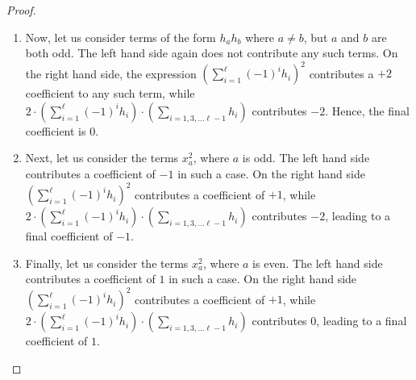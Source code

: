 \documentclass[11pt]{article}
\theoremstyle{definition}
\begin{document}
\begin{proof}
\begin{enumerate}
        \item Now, let us consider terms of the form  $h_ah_b$ where $a \neq b$, but $a$ and $b$ are both odd. The left hand side again does not contribute any such terms. On the right hand side, the expression $\left( \sum_{i = 1}^{\ell} (-1)^i h_i \right )^2$ contributes a $+2$ coefficient to any such term, while $2 \cdot \left ( \sum_{i = 1}^{\ell} (-1)^i h_i \right ) \cdot \left ( \sum_{i = 1, 3, \dots \ell-1} h_i \right )$ contributes $-2$. Hence, the final coefficient is $0$.
        \item Next, let us consider the terms $x_a^2$, where $a$ is odd. The left hand side contributes a coefficient of $-1$ in such a case. On the right hand side $\left( \sum_{i = 1}^{\ell} (-1)^i h_i \right )^2$ contributes a coefficient of $+1$, while $2 \cdot \left ( \sum_{i = 1}^{\ell} (-1)^i h_i \right ) \cdot \left ( \sum_{i = 1, 3, \dots \ell-1} h_i \right )$ contributes $-2$, leading to a final coefficient of $-1$. 
        \item Finally, let us consider the terms $x_a^2$, where $a$ is even. The left hand side contributes a coefficient of $1$ in such a case. On the right hand side $\left( \sum_{i = 1}^{\ell} (-1)^i h_i \right )^2$ contributes a coefficient of $+1$, while $2 \cdot \left ( \sum_{i = 1}^{\ell} (-1)^i h_i \right ) \cdot \left ( \sum_{i = 1, 3, \dots \ell-1} h_i \right )$ contributes $0$, leading to a final coefficient of $1$. 
    \end{enumerate}


\end{proof}
\end{document}
